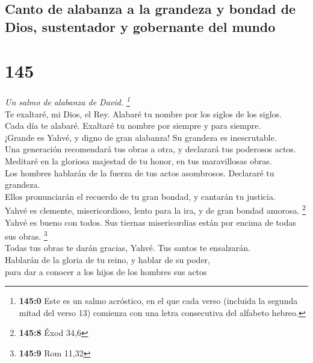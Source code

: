 \hypertarget{canto-de-alabanza-a-la-grandeza-y-bondad-de-dios-sustentador-y-gobernante-del-mundo}{%
\subsection{Canto de alabanza a la grandeza y bondad de Dios,
sustentador y gobernante del
mundo}\label{canto-de-alabanza-a-la-grandeza-y-bondad-de-dios-sustentador-y-gobernante-del-mundo}}

\hypertarget{section-142}{%
\section{145}\label{section-142}}

\emph{Un salmo de alabanza de David. \footnote{\textbf{145:0} Este es un
  salmo acróstico, en el que cada verso (incluida la segunda mitad del
  verso 13) comienza con una letra consecutiva del alfabeto hebreo.}}\\
 Te exaltaré, mi Dios, el Rey. Alabaré tu nombre por los
siglos de los siglos.\\
 Cada día te alabaré. Exaltaré tu nombre por siempre y
para siempre.\\
 ¡Grande es Yahvé, y digno de gran alabanza! Su grandeza
es inescrutable.\\
 Una generación recomendará tus obras a otra, y declarará
tus poderosos actos.\\
 Meditaré en la gloriosa majestad de tu honor, en tus
maravillosas obras.\\
 Los hombres hablarán de la fuerza de tus actos
asombrosos. Declararé tu grandeza.\\
 Ellos pronunciarán el recuerdo de tu gran bondad, y
cantarán tu justicia.\\
 Yahvé es clemente, misericordioso, lento para la ira, y
de gran bondad amorosa. \footnote{\textbf{145:8} Éxod 34,6}\\
 Yahvé es bueno con todos. Sus tiernas misericordias están
por encima de todas sus obras. \footnote{\textbf{145:9} Rom 11,32}\\
 Todas tus obras te darán gracias, Yahvé. Tus santos te
ensalzarán.\\
 Hablarán de la gloria de tu reino, y hablar de su
poder,\\
 para dar a conocer a los hijos de los hombres sus actos
